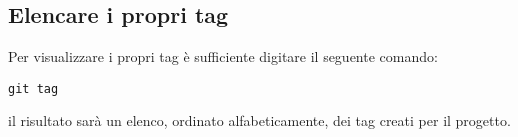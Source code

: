 \subsection{Elencare i propri tag}
Per visualizzare i propri tag è sufficiente digitare il seguente comando:

\begin{center}
\texttt{git tag}
\end{center}

il risultato sarà un elenco, ordinato alfabeticamente, dei tag creati per il progetto.